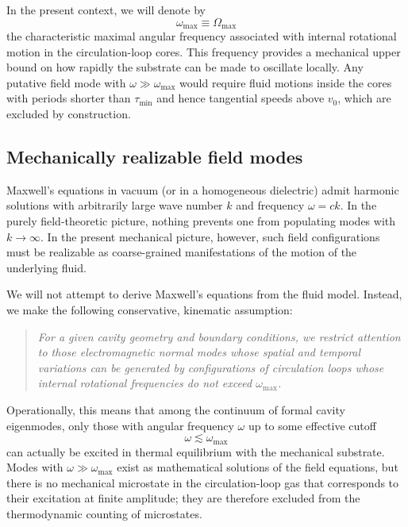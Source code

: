 \documentclass[11pt]{article}
\begin{document}
            In the present context, we will denote by
            \begin{equation}
                \omega_{\max} \equiv \Omega_{\max}
            \end{equation}
            the characteristic maximal angular frequency associated with internal rotational
            motion in the circulation-loop cores.
            This frequency provides a mechanical upper bound on how rapidly the substrate
            can be made to oscillate locally. Any putative field mode with $\omega \gg \omega_{\max}$
            would require fluid motions inside the cores with periods shorter than $\tau_{\min}$
            and hence tangential speeds above $v_0$, which are excluded by construction.

        \subsection{Mechanically realizable field modes}

            Maxwell's equations in vacuum (or in a homogeneous dielectric) admit harmonic
            solutions with arbitrarily large wave number $k$ and frequency
            $\omega = c k$.
            In the purely field-theoretic picture, nothing prevents one from populating modes
            with $k \to \infty$. In the present mechanical picture, however, such field
            configurations must be realizable as coarse-grained manifestations of the motion
            of the underlying fluid.

            We will not attempt to derive Maxwell's equations from the fluid model.
            Instead, we make the following conservative, kinematic assumption:

            \begin{quote}
                \emph{For a given cavity geometry and boundary conditions, we restrict attention
                to those electromagnetic normal modes whose spatial and temporal variations can
                be generated by configurations of circulation loops whose internal rotational
                frequencies do not exceed $\omega_{\max}$.}
            \end{quote}

            Operationally, this means that among the continuum of formal cavity eigenmodes,
            only those with angular frequency $\omega$ up to some effective cutoff
            \begin{equation}
                \omega \lesssim \omega_{\max}
                \label{eq:omega-cut}
            \end{equation}
            can actually be excited in thermal equilibrium with the mechanical substrate.
            Modes with $\omega \gg \omega_{\max}$ exist as mathematical solutions of the field
            equations, but there is no mechanical microstate in the circulation-loop gas that
            corresponds to their excitation at finite amplitude; they are therefore excluded
            from the thermodynamic counting of microstates.
\end{document}
